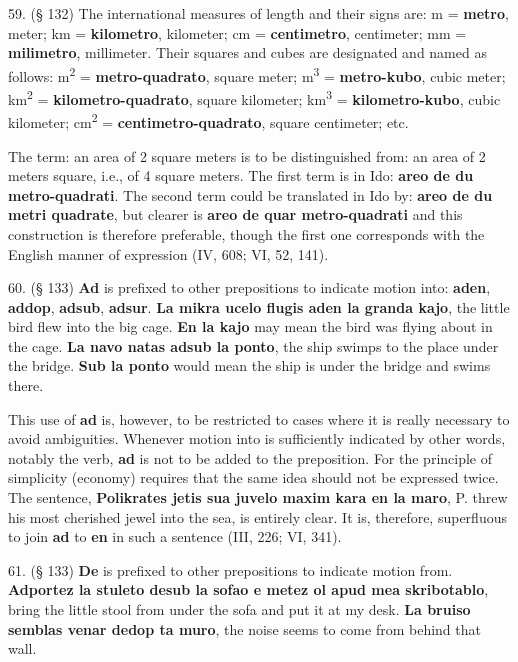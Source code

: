 59. (§ 132) The international measures of length and their signs are: m = \textbf{metro}, meter; km = \textbf{kilometro}, kilometer; cm = \textbf{centimetro}, centimeter; mm = \textbf{milimetro}, millimeter. Their squares and cubes are designated and named as follows: m\textsuperscript{2} = \textbf{metro-quadrato}, square meter; m\textsuperscript{3} = \textbf{metro-kubo}, cubic meter; km\textsuperscript{2} = \textbf{kilometro-quadrato}, square kilometer; km\textsuperscript{3} = \textbf{kilometro-kubo}, cubic kilometer; cm\textsuperscript{2} = \textbf{centimetro-quadrato}, square centimeter; etc. %

The term: an area of 2 square meters is to be distinguished from: an area of 2 meters square, i.e., of 4 square meters. The first term is in Ido: \textbf{areo de du metro-quadrati}. The second term could be translated in Ido by: \textbf{areo de du metri quadrate}, but clearer is \textbf{areo de quar metro-quadrati} and this construction is therefore preferable, though the first one corresponds with the English manner of expression (IV, 608; VI, 52, 141).

60. (§ 133) \textbf{Ad} is prefixed to other prepositions to indicate motion into: \textbf{aden}, \textbf{addop}, \textbf{adsub}, \textbf{adsur}. \textbf{La mikra ucelo flugis aden la granda kajo}, the little bird flew into the big cage. \textbf{En la kajo} may mean the bird was flying about in the cage. \textbf{La navo natas adsub la ponto}, the ship swimps to the place under the bridge. \textbf{Sub la ponto} would mean the ship is under the bridge and swims there. %

This use of \textbf{ad} is, however, to be restricted to cases where it is really necessary to avoid ambiguities. Whenever motion into is sufficiently indicated by other words, notably the verb, \textbf{ad} is not to be added to the preposition. For the principle of simplicity (economy) requires that the same idea should not be expressed twice. The sentence, \textbf{Polikrates jetis sua juvelo maxim kara en la maro}, P. threw his most cherished jewel into the sea, is entirely clear. It is, therefore, superfluous to join \textbf{ad} to \textbf{en} in such a sentence (III, 226; VI, 341).

61. (§ 133) \textbf{De} is prefixed to other prepositions to indicate motion from. \textbf{Adportez la stuleto desub la sofao e metez ol apud mea skribotablo}, bring the little stool from under the sofa and put it at my desk. \textbf{La bruiso semblas venar dedop ta muro}, the noise seems to come from behind that wall. %

